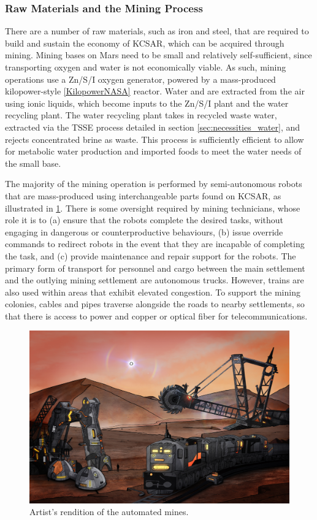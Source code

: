 \documentclass[fleqn,10pt]{Stylesheet} %
\begin{document}
\subsubsection{Raw Materials and the Mining Process}
\label{sec:necessities_raw}

There are a number of raw materials, such as iron and steel, that are required to build and sustain the economy of KCSAR, which can be acquired through mining. Mining bases on Mars need to be small and relatively self-sufficient, since transporting oxygen and water is not economically viable. As such, mining operations use a Zn/S/I oxygen generator, powered by a mass-produced kilopower-style \ref{KilopowerNASA} reactor. Water and  are extracted from the air using ionic liquids, which become inputs to the Zn/S/I plant and the water recycling plant. The water recycling plant takes in recycled waste water, extracted via the TSSE process detailed in section \ref{sec:necessities_water}, and rejects concentrated brine as waste. This process is sufficiently efficient to allow for metabolic water production and imported foods to meet the water needs of the small base.

The majority of the mining operation is performed by semi-autonomous robots that are mass-produced using interchangeable parts found on KCSAR, as illustrated in \ref{fig:mines}. There is some oversight required by mining technicians, whose role it is to (a) ensure that the robots complete the desired tasks, without engaging in dangerous or counterproductive behaviours, (b) issue override commands to redirect robots in the event that they are incapable of completing the task, and (c) provide maintenance and repair support for the robots. The primary form of transport for personnel and cargo between the main settlement and the outlying mining settlement are autonomous trucks. However, trains are also used within areas that exhibit elevated congestion. To support the mining colonies, cables and pipes traverse alongside the roads to nearby settlements, so that there is access to power and copper or optical fiber for telecommunications.

\begin{figure}
    \centering
    \includegraphics[width=\linewidth]{art/mining.jpg}
    \caption{Artist's rendition of the automated mines.}
    \label{fig:mines}
\end{figure}
\end{document}
